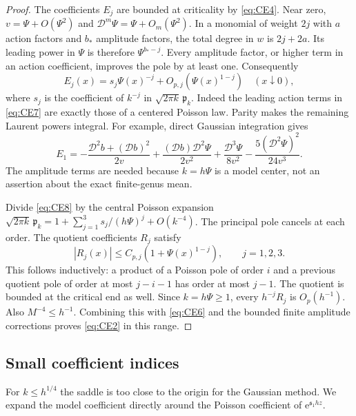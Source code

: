 \begin{proof}
The coefficients $E_j$ are bounded at criticality by
\eqref{eq:CE4}. Near zero, $v=\Psi+O(\Psi^2)$ and
$\mathscr D^m\Psi=\Psi+O_m(\Psi^2)$. In a monomial of weight $2j$
with $a$ action factors and $b_*$ amplitude factors, the total degree
in $w$ is $2j+2a$. Its leading power in $\Psi$ is therefore
$\Psi^{b_*-j}$. Every amplitude factor, or higher term in an action
coefficient, improves the pole by at least one. Consequently
\begin{equation}
 E_j(x)=s_j\Psi(x)^{-j}+O_{p,j}(\Psi(x)^{1-j})
       \quad(x\downarrow0),
 \label{eq:CE9}
\end{equation}
where $s_j$ is the coefficient of $k^{-j}$ in
$\sqrt{2\pi k}\,\mathfrak p_k$. Indeed the leading action terms in
\eqref{eq:CE7} are exactly those of a centered Poisson law.
Parity makes the remaining Laurent powers integral.
For example, direct Gaussian integration gives
\[
 E_1=-\frac{\mathscr D^2b+(\mathscr Db)^2}{2v}
      +\frac{(\mathscr Db)\mathscr D^2\Psi}{2v^2}
      +\frac{\mathscr D^3\Psi}{8v^2}
      -\frac{5(\mathscr D^2\Psi)^2}{24v^3}.
\]
The amplitude terms are needed because $k=h\Psi$ is a model center,
not an assertion about the exact finite-genus mean.

Divide \eqref{eq:CE8} by the central Poisson expansion
$\sqrt{2\pi k}\,\mathfrak p_k=1+\sum_{j=1}^3s_j/(h\Psi)^j+O(k^{-4})$.
The principal pole cancels at each order. The quotient coefficients
$R_j$ satisfy
\begin{equation}
 |R_j(x)|\le C_{p,j}(1+\Psi(x)^{1-j}),\qquad j=1,2,3.
 \label{eq:CE10}
\end{equation}
This follows inductively: a product of a Poisson pole of order $i$
and a previous quotient pole of order at most $j-i-1$ has order
at most $j-1$. The quotient is bounded at the critical end as well.
Since $k=h\Psi\ge1$, every $h^{-j}R_j$ is $O_p(h^{-1})$.
Also $M^{-4}\le h^{-1}$. Combining this with \eqref{eq:CE6}
and the bounded finite amplitude corrections proves
\eqref{eq:CE2} in this range.
\end{proof}

\subsection{Small coefficient indices}\label{app:small-indices}

For $k\le h^{1/4}$ the saddle is too close to the origin for the Gaussian
method. We expand the model coefficient directly around the Poisson
coefficient of $\mathrm e^{\mathfrak s_1hz}$.

